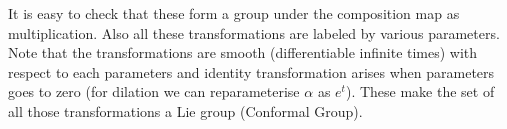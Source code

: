 \documentclass[12pt,a4paper,oneside]{book}
\theoremstyle{definition}
\newtheorem{definition}{Definition}[section]
\begin{document}
        It is easy to check that these form a group under the composition map as multiplication. Also all these transformations are labeled by various parameters. Note that the transformations are smooth (differentiable infinite times) with respect to each parameters and identity transformation arises when parameters goes to zero (for dilation we can reparameterise $\alpha$ as $e^{t}$). These make the set of all those transformations a Lie group (Conformal Group).
\end{document}
